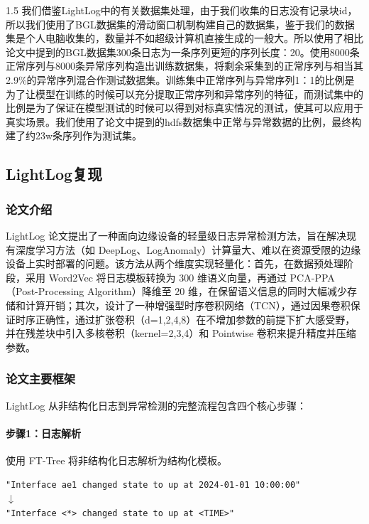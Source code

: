 \documentclass[a4paper,12pt]{report}
\begin{document}
\begin{spacing}{1.5}
我们借鉴LightLog中\cite{wang2022lightlog}的有关数据集处理，由于我们收集的日志没有记录块id，所以我们使用了BGL数据集的滑动窗口机制构建自己的数据集，鉴于我们的数据集是个人电脑收集的，数量并不如超级计算机直接生成的一般大。所以使用了相比论文中提到的BGL数据集300条日志为一条序列更短的序列长度：20。使用8000条正常序列与8000条异常序列构造出训练数据集，将剩余采集到的正常序列与相当其2.9\%的异常序列混合作测试数据集。训练集中正常序列与异常序列1：1的比例是为了让模型在训练的时候可以充分提取正常序列和异常序列的特征，而测试集中的比例是为了保证在模型测试的时候可以得到对标真实情况的测试，使其可以应用于真实场景。我们使用了论文中提到的hdfs数据集中正常与异常数据的比例，最终构建了约23w条序列作为测试集。

\subsection{LightLog复现}

\subsubsection*{论文介绍}
LightLog\cite{wang2022lightlog} 论文提出了一种面向边缘设备的轻量级日志异常检测方法，旨在解决现有深度学习方法（如 DeepLog、LogAnomaly）计算量大、难以在资源受限的边缘设备上实时部署的问题。该方法从两个维度实现轻量化：首先，在数据预处理阶段，采用 Word2Vec 将日志模板转换为 300 维语义向量，再通过 PCA-PPA（Post-Processing Algorithm）降维至 20 维，在保留语义信息的同时大幅减少存储和计算开销；其次，设计了一种增强型时序卷积网络（TCN），通过因果卷积保证时序正确性，通过扩张卷积（d=1,2,4,8）在不增加参数的前提下扩大感受野，并在残差块中引入多核卷积（kernel=2,3,4）和 Pointwise 卷积来提升精度并压缩参数。

\subsubsection{论文主要框架}
LightLog\cite{wang2022lightlog} 从非结构化日志到异常检测的完整流程包含四个核心步骤：

\paragraph{步骤1：日志解析}
使用 FT-Tree 将非结构化日志解析为结构化模板。
\begin{center}
\verb|"Interface ae1 changed state to up at 2024-01-01 10:00:00"| \\
$\downarrow$ \\
\verb|"Interface <*> changed state to up at <TIME>"|
\end{center}


\end{spacing}
\end{document}
